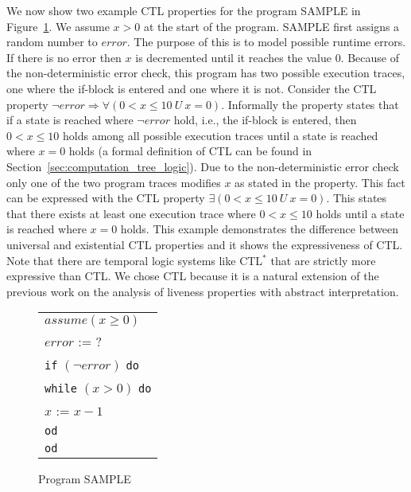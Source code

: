 \documentclass[11pt,a4paper,titlepage]{article}
\theoremstyle{definition}
\begin{document}
We now show two example CTL properties for the program \textsf{SAMPLE} in Figure~\ref{fig:introduction_sample}. 
We assume $x>0$ at the start of the program. \textsf{SAMPLE} first assigns a random number to $error$. 
The purpose of this is to model possible runtime errors. 
If there is no error then $x$ is decremented until it reaches the value $0$.
Because of the non-deterministic error check, this program has two possible execution traces, one where the if-block is entered and one
where it is not. Consider the CTL property $\neg error \Rightarrow \forall(0 < x \leq 10 \ U \ x = 0)$. 
Informally the property states that if a state is reached where $\neg error$ hold, i.e., the
if-block is entered, then $0 < x \leq 10$ holds among all possible execution traces until a state is reached where $x=0$ holds
(a formal definition of CTL can be found in Section~\ref{sec:computation_tree_logic}). Due to the non-deterministic error check only one of the
two program traces modifies $x$ as stated in the property. 
This fact can be expressed with the CTL property $\exists(0 < x \leq 10 \ U \ x = 0)$. This states that there exists at least one execution trace
where $0 < x \leq 10$ holds until a state is reached where $x = 0$ holds. This example demonstrates the difference between universal and existential 
CTL properties and it shows the expressiveness of CTL. Note that there are temporal logic systems like CTL$^{*}$
that are strictly more expressive than CTL. We chose CTL because it is a natural extension of 
the previous work on the analysis of liveness properties with abstract interpretation.\\


\begin{figure}
    \begin{center}
        \begin{tabular}{l}
            $assume(x \geq 0)$ \\
            $error$ := ? \\
            \texttt{if} $(\neg error)$ \texttt{do} \\
            \hspace{1em}\texttt{while} $(x > 0)$ \texttt{do} \\
            \hspace{2em}$x$ := $x - 1$ \\
            \hspace{1em}\texttt{od}\\
            \texttt{od}
        \end{tabular}
    \end{center}
    \vspace{-1em}
    \caption{Program \textsf{SAMPLE}}
    \label{fig:introduction_sample}
\end{figure}
\end{document}
